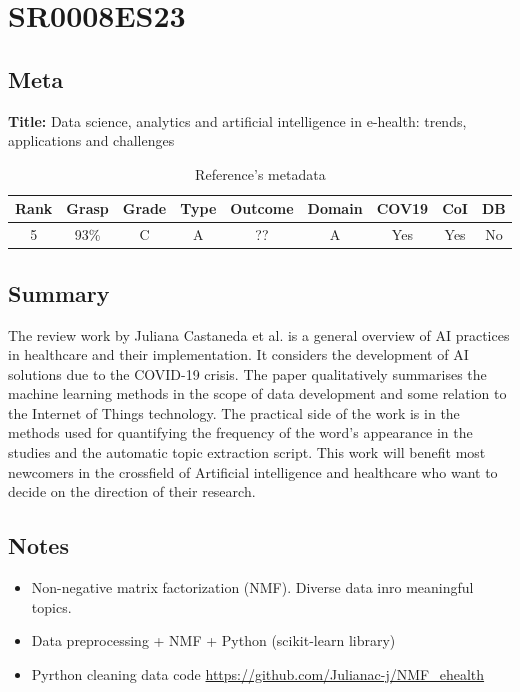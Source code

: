 \section{ SR0008ES23 }


\subsection{Meta}

    \textbf{Title:}
    Data science, analytics and artificial intelligence in e-health: trends, applications and challenges

    \begin{table}[H]
        \centering
        \begin{tabular}{|c|c|c|c|c|c|c|c|c|}
            \hline
                \textbf{Rank} & \textbf{Grasp} & \textbf{Grade} & \textbf{Type} & \textbf{Outcome} & \textbf{Domain} & \textbf{COV19} & \textbf{CoI} & \textbf{DB} \\
            \hline
                5 & 93\% & C & A & ?? & A & Yes & Yes & No \\
            \hline
        \end{tabular}
        \caption{Reference's metadata}
        \label{tab:SR0008ES23}
    \end{table}

\subsection{Summary}
    The review work by Juliana Castaneda et al. \cite{x249} is a general overview of AI practices in healthcare and their implementation. It considers the development of AI solutions due to the COVID-19 crisis. The paper qualitatively summarises the machine learning methods in the scope of data development and some relation to the Internet of Things technology. The practical side of the work is in the methods used for quantifying the frequency of the word's appearance in the studies and the automatic topic extraction script. This work will benefit most newcomers in the crossfield of Artificial intelligence and healthcare who want to decide on the direction of their research.

\subsection{Notes}
    \begin{itemize}
        \item Non-negative matrix factorization (NMF). Diverse data inro meaningful topics.
        \item Data preprocessing + NMF + Python (scikit-learn library)
        \item Pyrthon cleaning data code \url{https://github.com/Julianac-j/NMF_ehealth}
    \end{itemize}


